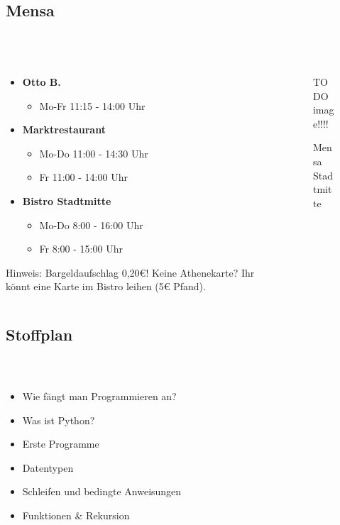 \subsection{Mensa}
\begin{frame}
	\frametitle{\insertsectionhead \\ {\small \insertsubsectionhead}}
	\begin{columns}
		\begin{column}{5cm}
			\begin{itemize}
				\item \textbf{Otto B.}
				\begin{itemize}
					\item Mo-Fr 11:15 - 14:00 Uhr
				\end{itemize}
				\item \textbf{Marktrestaurant}
				\begin{itemize}
					\item Mo-Do 11:00 - 14:30 Uhr
					\item Fr 11:00 - 14:00 Uhr
				\end{itemize}
				\item \textbf{Bistro Stadtmitte }
				\begin{itemize}
					\item Mo-Do 8:00 - 16:00 Uhr
					\item Fr 8:00 - 15:00 Uhr
				\end{itemize}
			\end{itemize}
			\begin{block}{Hinweis:}
				Bargeldaufschlag 0,20€! Keine Athenekarte? Ihr könnt eine Karte im Bistro leihen (5€ Pfand).
			\end{block}
		\end{column}
		\begin{column}{7.2cm}
			\vspace{-2.5ex}
			\begin{figure}
				TODO image!!!!
				\caption{Mensa Stadtmitte}
			\end{figure}
		\end{column}
	\end{columns}
\end{frame}


\subsection{Stoffplan}
\begin{frame}
	\frametitle{\insertsectionhead \\ {\small \insertsubsectionhead}}
	\begin{itemize}
		\item Wie fängt man Programmieren an?
		\item Was ist Python?
		\item Erste Programme
		\item Datentypen
		\item Schleifen und bedingte Anweisungen
		\item Funktionen \& Rekursion
	\end{itemize}
\end{frame}

